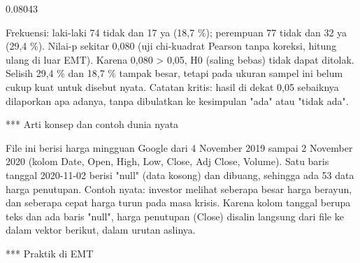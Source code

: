 \documentclass[a4paper,10pt]{article}
\begin{document}
\begin{eulernotebook}
\begin{eulercomment}
\begin{eulercomment}
\begin{eulercomment}
\begin{eulercomment}
\begin{eulercomment}
\begin{eulercomment}
\begin{eulercomment}
\begin{eulercomment}
\begin{eulercomment}
\begin{eulercomment}
\begin{eulercomment}
\begin{eulercomment}
\begin{eulercomment}
\begin{eulercomment}
\begin{eulercomment}
\begin{eulercomment}
\begin{eulercomment}
\begin{eulercomment}
\begin{eulercomment}
\begin{eulercomment}
\begin{eulercomment}
\begin{eulercomment}
\begin{eulercomment}
\begin{eulercomment}
\begin{eulercomment}
\begin{eulercomment}
\begin{eulercomment}
\begin{eulercomment}
\begin{euleroutput}
  0.08043
\end{euleroutput}
\begin{eulercomment}
Frekuensi: laki-laki 74 tidak dan 17 ya (18,7 \%); perempuan 77 tidak dan 32 ya (29,4 \%).
Nilai-p sekitar 0,080 (uji chi-kuadrat Pearson tanpa koreksi, hitung ulang di luar EMT).
Karena 0,080 \textgreater{} 0,05, H0 (saling bebas) tidak dapat ditolak. Selisih 29,4 \% dan 18,7 \% tampak
besar, tetapi pada ukuran sampel ini belum cukup kuat untuk disebut nyata. Catatan kritis:
hasil di dekat 0,05 sebaiknya dilaporkan apa adanya, tanpa dibulatkan ke kesimpulan "ada" atau
"tidak ada".

\end{eulercomment}
\begin{eulercomment}
*** Arti konsep dan contoh dunia nyata

File ini berisi harga mingguan Google dari 4 November 2019 sampai 2 November 2020 (kolom
Date, Open, High, Low, Close, Adj Close, Volume). Satu baris tanggal 2020-11-02 berisi
"null" (data kosong) dan dibuang, sehingga ada 53 data harga penutupan. Contoh nyata: investor
melihat seberapa besar harga berayun, dan seberapa cepat harga turun pada masa krisis.
Karena kolom tanggal berupa teks dan ada baris "null", harga penutupan (Close) disalin
langsung dari file ke dalam vektor berikut, dalam urutan aslinya.

*** Praktik di EMT


\end{eulercomment}
\end{eulercomment}
\end{eulercomment}
\end{eulercomment}
\end{eulercomment}
\end{eulercomment}
\end{eulercomment}
\end{eulercomment}
\end{eulercomment}
\end{eulercomment}
\end{eulercomment}
\end{eulercomment}
\end{eulercomment}
\end{eulercomment}
\end{eulercomment}
\end{eulercomment}
\end{eulercomment}
\end{eulercomment}
\end{eulercomment}
\end{eulercomment}
\end{eulercomment}
\end{eulercomment}
\end{eulercomment}
\end{eulercomment}
\end{eulercomment}
\end{eulercomment}
\end{eulercomment}
\end{eulercomment}
\end{eulercomment}
\end{eulernotebook}
\end{document}
